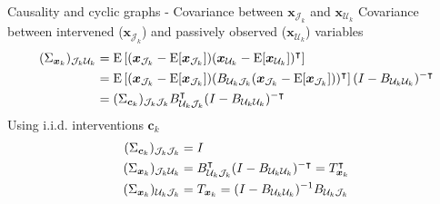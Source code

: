 \begin{frame}{Causality and cyclic graphs - Covariance between $\boldsymbol{x}_{\mathcal{J}_k}$ and $\boldsymbol{x}_{\mathcal{U}_k}$}
Covariance between intervened ($\boldsymbol{x}_{\mathcal{J}_k}$) and passively observed ($\boldsymbol{x}_{\mathcal{U}_k}$) variables
\begin{subequations}
\label{eq:causal_cov}
\begin{align}
(\Sigma_{\boldsymbol{x}_k})_{\mathcal{J}_k\mathcal{U}_k} &=
\operatorname{\text{E}} \left[ (\boldsymbol{x}_{\mathcal{J}_k} - \operatorname{\text{E}}[\boldsymbol{x}_{\mathcal{J}_k}])
(\boldsymbol{x}_{\mathcal{U}_k} - \operatorname{\text{E}}[\boldsymbol{x}_{\mathcal{U}_k}])^\intercal \right]
\\
&= \operatorname{\text{E}} \left[
(\boldsymbol{x}_{\mathcal{J}_k} - \operatorname{\text{E}}[\boldsymbol{x}_{\mathcal{J}_k}])
(B_{\mathcal{U}_k\mathcal{J}_k} (\boldsymbol{x}_{\mathcal{J}_k} - \operatorname{\text{E}}[\boldsymbol{x}_{\mathcal{J}_k}]))^\intercal
\right]
(I - B_{\mathcal{U}_k\mathcal{U}_k})^{-\intercal}
\\
&= (\Sigma_{\boldsymbol{c}_k})_{\mathcal{J}_k\mathcal{J}_k} B^\intercal_{\mathcal{U}_k\mathcal{J}_k} (I - B_{\mathcal{U}_k\mathcal{U}_k})^{-\intercal}
\end{align}
\end{subequations}
Using i.i.d. interventions $\boldsymbol{c}_k$
\begin{subequations}
\label{eq:eberhardt_cov}
\begin{align}
(\Sigma_{\boldsymbol{c}_k})_{\mathcal{J}_k\mathcal{J}_k} &= I
\\
(\Sigma_{\boldsymbol{x}_k})_{\mathcal{J}_k\mathcal{U}_k} &= B^\intercal_{\mathcal{U}_k\mathcal{J}_k} (I - B_{\mathcal{U}_k\mathcal{U}_k})^{-\intercal}
= T_{\boldsymbol{x}_k}^\intercal
\\
(\Sigma_{\boldsymbol{x}_k})_{\mathcal{U}_k\mathcal{J}_k} &=
T_{\boldsymbol{x}_k} =
(I - B_{\mathcal{U}_k\mathcal{U}_k})^{-1} 
B_{\mathcal{U}_k\mathcal{J}_k} 
\end{align}
\end{subequations}
\end{frame}

